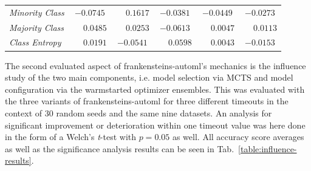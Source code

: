 \begin{table}[ht]
\begin{subtable}{\textwidth}
\begin{tabular}{l|ccccc}
            \textit{Minority Class} & $-0.0745$ & $\phantom{-}0.1617$ & $-0.0381$ & $-0.0449$ & $-0.0273$ \\
            \textit{Majority Class} & $\phantom{-}0.0485$ & $\phantom{-}0.0253$ & $-0.0613$ & $\phantom{-}0.0047$ & $\phantom{-}0.0113$ \\
            \textit{Class Entropy} & $\phantom{-}0.0191$ & $-0.0541$ & $\phantom{-}0.0598$ & $\phantom{-}0.0043$ & $-0.0153$ \\
            \hline
        \end{tabular}
    \end{subtable}
\end{table}

The second evaluated aspect of frankensteins-automl's mechanics is the influence study of the two main components, i.e. model selection via MCTS and model configuration via the warmstarted optimizer ensembles.\newline
This was evaluated with the three variants of frankensteins-automl for three different timeouts in the context of 30 random seeds and the same nine datasets.
An analysis for significant improvement or deterioration within one timeout value was here done in the form of a Welch's \textit{t}-test with $p = 0.05$ as well.\newline
All accuracy score averages as well as the significance analysis results can be seen in Tab.~\ref{table:influence-results}.

